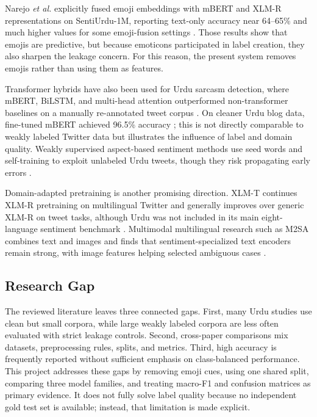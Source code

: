 \documentclass[conference]{IEEEtran}
\begin{document}
Narejo \emph{et al.} explicitly fused emoji embeddings with mBERT and XLM-R representations on SentiUrdu-1M, reporting text-only accuracy near 64--65\% and much higher values for some emoji-fusion settings \cite{narejo2024emoji}. Those results show that emojis are predictive, but because emoticons participated in label creation, they also sharpen the leakage concern. For this reason, the present system removes emojis rather than using them as features.

Transformer hybrids have also been used for Urdu sarcasm detection, where mBERT, BiLSTM, and multi-head attention outperformed non-transformer baselines on a manually re-annotated tweet corpus \cite{hassan2024sarcasm}. On cleaner Urdu blog data, fine-tuned mBERT achieved 96.5\% accuracy \cite{saeed2024indepth}; this is not directly comparable to weakly labeled Twitter data but illustrates the influence of label and domain quality. Weakly supervised aspect-based sentiment methods use seed words and self-training to exploit unlabeled Urdu tweets, though they risk propagating early errors \cite{zoya2023weakly}.

Domain-adapted pretraining is another promising direction. XLM-T continues XLM-R pretraining on multilingual Twitter and generally improves over generic XLM-R on tweet tasks, although Urdu was not included in its main eight-language sentiment benchmark \cite{barbieri2022xlmt}. Multimodal multilingual research such as M2SA combines text and images and finds that sentiment-specialized text encoders remain strong, with image features helping selected ambiguous cases \cite{thakkar2024m2sa}.

\subsection{Research Gap}

The reviewed literature leaves three connected gaps. First, many Urdu studies use clean but small corpora, while large weakly labeled corpora are less often evaluated with strict leakage controls. Second, cross-paper comparisons mix datasets, preprocessing rules, splits, and metrics. Third, high accuracy is frequently reported without sufficient emphasis on class-balanced performance. This project addresses these gaps by removing emoji cues, using one shared split, comparing three model families, and treating macro-F1 and confusion matrices as primary evidence. It does not fully solve label quality because no independent gold test set is available; instead, that limitation is made explicit.
\end{document}
